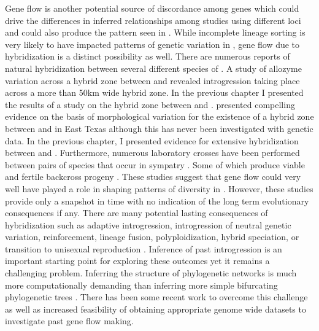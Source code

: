



Gene flow is another potential source of discordance among genes which could  
drive the differences in inferred relationships among studies using different 
loci and could also produce the pattern seen in \fowl \parencite{degnan2009}. 
While incomplete lineage sorting is very likely to have impacted patterns of genetic  
variation in \anaxyrus, gene flow due to hybridization is a distinct possibility as well.
There are numerous reports of natural hybridization between several different 
species of \anaxyrus \parencite{green1996}. 
A study of allozyme variation across a hybrid zone between \amer and 
\hemiophrys revealed introgression taking place across a more than 50km wide hybrid zone.
In the previous chapter I presented the results of a study on the hybrid zone
between \amer and \terr \parencite{green1983}.
\cite{meacham1962} presented compelling evidence on the basis of morphological 
variation for the existence of a hybrid zone between \fowl and \wood in East Texas
although this has never been investigated with genetic data. 
In the previous chapter, I presented evidence for extensive hybridization between
\amer and \terr.
Furthermore, numerous laboratory crosses have been performed between pairs of \anaxyrus 
species that occur in sympatry \parencite{blair1972,blair1963}.
Some of which produce viable and fertile backcross progeny \parencite{blair1972,blair1963}.
These studies suggest that gene flow could very well have played a role in shaping patterns
of diversity in \anaxyrus. 
However, these studies provide only a snapshot in time with no indication of the long term 
evolutionary consequences if any.
There are many potential lasting consequences of hybridization such as adaptive introgression, 
introgression of neutral genetic variation, reinforcement, lineage fusion, 
polyploidization, hybrid speciation, or transition to unisexual reproduction \parencite{abbott2013}. 
Inference of past introgression is an important starting point for exploring these
outcomes yet it remains a challenging problem. 
Inferring the structure of phylogenetic networks is much more computationally 
demanding than inferring more simple bifurcating phylogenetic trees \parencite{wen2018}. 
There has been some recent work to overcome this challenge as well as increased 
feasibility of obtaining appropriate genome wide datasets to investigate past 
gene flow making.


